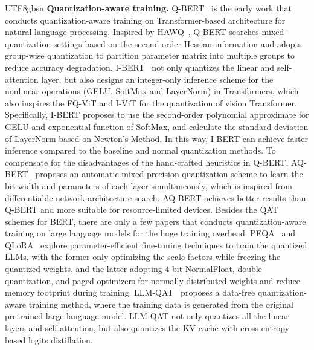 \documentclass[10pt,journal,compsoc]{IEEEtran}
\newcommand{\<}{\left\langle}
\renewcommand{\>}{\right\rangle}
\newcommand{\1}{\mathbbm{1}}
\begin{document}
\begin{CJK}{UTF8}{gbsn}
\noindent \textbf{Quantization-aware training.} 
Q-BERT~\cite{shen2020q} is the early work that conducts quantization-aware training on Transformer-based architecture for natural language processing. Inspired by HAWQ~\cite{dong2019hawq}, Q-BERT searches mixed-quantization settings based on the second order Hessian information and adopts group-wise quantization to partition parameter matrix into multiple groups to reduce accuracy degradation. I-BERT~\cite{kim2021bert} not only quantizes the linear and self-attention layer, but also designs an integer-only inference scheme for the nonlinear operations (GELU, SoftMax and LayerNorm) in Transformers, which also inspires the FQ-ViT and I-ViT for the quantization of vision Transformer. Specifically, I-BERT proposes to use the second-order polynomial approximate for GELU and exponential function of SoftMax, and calculate the standard deviation of LayerNorm based on Newton’s Method. In this way, I-BERT can achieve faster inference compared to the baseline and normal quantization methods. To compensate for the disadvantages of the hand-crafted heuristics in Q-BERT, AQ-BERT~\cite{zhao2021automatic} proposes an automatic mixed-precision quantization scheme to learn the bit-width and parameters of each layer simultaneously, which is inspired from differentiable network architecture search. AQ-BERT achieves better results than Q-BERT and more suitable for resource-limited devices. Besides the QAT schemes for BERT, there are only a few papers that conducts quantization-aware training on large language models for the huge training overhead. PEQA~\cite{kim2023memory} and QLoRA~\cite{dettmers2023qlora}
explore parameter-efficient fine-tuning techniques to train the quantized LLMs, with the former only optimizing the scale factors while freezing the quantized weights, and the latter adopting 4-bit NormalFloat, double quantization, and paged optimizers for normally distributed weights and reduce memory footprint during training. LLM-QAT~\cite{liu2023llm} proposes a data-free quantization-aware training method, where the training data is generated from the original pretrained large language model. LLM-QAT not only quantizes all the linear layers and self-attention, but also quantizes the KV cache with cross-entropy based logits distillation.



\end{CJK}
\end{document}
